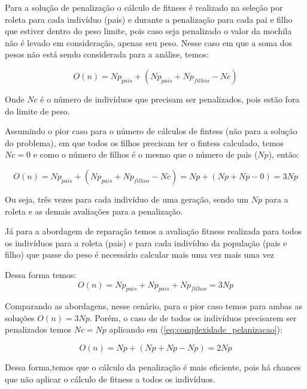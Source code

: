 \documentclass[11pt]{article}
\begin{document}
Para a solução de penalização o cálculo de fitness é realizado na seleção por roleta para cada indivíduo (pais) e durante a penalização para cada pai e filho que estiver dentro do peso limite, pois caso seja penalizado o valor da mochila não é levado em consideração, apenas seu peso. Nesse caso em que a soma dos pesos não está sendo considerada para a análise, temos:

\begin{equation} \label{eq:complexidade_pelanizacao}
	O(n) = Np_{pais} + (Np_{pais} + Np_{filhos} - Nc)
\end{equation}

Onde $Nc$ é o número de indivíduos que precisam ser penalizados, pois estão fora do limite de peso. 

Assumindo o pior caso para o número de cálculos de fintess (não para a solução do problema), em que todos os filhos precisam ter o fintess calculado, temos $Nc = 0 $ e como o número de filhos é o mesmo que o número de pais ($Np$), então:

\begin{equation} \label{eq:complexidade_pelanizacao_pior_caso}
	O(n) = Np_{pais} + (Np_{pais} + Np_{filhos} - Nc) = Np + (Np + Np - 0) = 3Np
\end{equation}

Ou seja, três vezes para cada indivíduo de uma geração, sendo um $Np$ para a roleta e as demais avaliações para a penalização.

Já para a abordagem de reparação temos a avaliação fitness realizada para todos os indivíduos para a roleta (pais) e para cada indivíduo da população (pais e filho) que passe do peso é necessário calcular mais uma vez mais uma vez

Dessa forma temos:
\begin{equation} \label{eq:complexidade_reparacao}
	O(n) = Np_{pais} + Np_{pais} + Np_{filhos} = 3Np
\end{equation}

Comparando as abordagens, nesse cenário, para o pior caso temos para ambas as soluções $O(n) = 3Np$. Porém, o caso de de todos os indivíduos precisarem ser penalizados temos $Nc = Np$ aplicando em (\ref{eq:complexidade_pelanizacao}):

\begin{equation} \label{eq:complexidade_pelanizacao_pior_caso}
	O(n) = Np + (Np + Np - Np) = 2Np
\end{equation}

Dessa forma,temos que o cálculo da penalização é mais eficiente, pois há chances que não aplicar o cálculo de fitness a todos os indivíduos.
\end{document}
